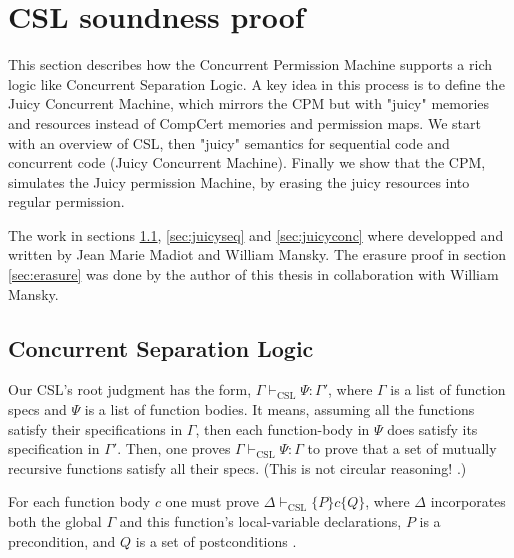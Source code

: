 \section{CSL soundness proof}
\label{sec:CSLsound}

This section describes how the Concurrent Permission Machine supports a rich logic like Concurrent Separation Logic. 
A key idea in this process is to define the Juicy Concurrent Machine, which mirrors the CPM but with "juicy" memories and resources instead of CompCert memories and permission maps.
We start with an overview of CSL, then "juicy" semantics for sequential code and concurrent code (Juicy Concurrent Machine). Finally we show that the CPM, simulates the Juicy permission Machine, by erasing the juicy resources into regular permission.

The work in sections \ref{sec:csl}, \ref{sec:juicyseq} and \ref{sec:juicyconc} where developped and written by Jean Marie Madiot and William Mansky. The erasure proof in section \ref{sec:erasure} was done by the author of this thesis in collaboration with William Mansky.


\subsection{Concurrent Separation Logic}
\label{sec:csl}

Our CSL's root judgment has the form,
$\Gamma \vdash_\mathrm{CSL} \Psi:\Gamma'$,
where $\Gamma$ is a list of function specs
and $\Psi$ is a list of function bodies.
It means, assuming all the functions satisfy their specifications
in $\Gamma$, then each function-body in $\Psi$ does satisfy
its specification in $\Gamma'$.  Then, one proves
$\Gamma \vdash_\mathrm{CSL} \Psi:\Gamma$
to prove that a set of mutually recursive functions satisfy
all their specs.  (This is not circular reasoning!
\cite[Equation 81]{appel07:popl}.)

For each function body $c$ one must prove
$\Delta \vdash_\mathrm{CSL}\{P\} c \{Q\}$,
where $\Delta$ incorporates both the global $\Gamma$
and this function's local-variable declarations,
$P$ is a precondition, and $Q$ is a set of postconditions  \cite[Ch.~24,25]{appel14:plcc}.


